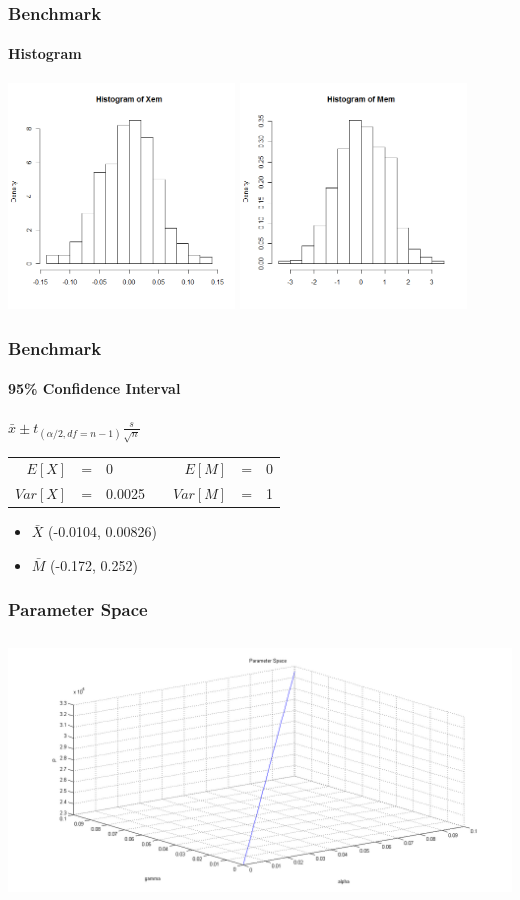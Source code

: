 \begin{frame}
    \frametitle{Benchmark}
	\framesubtitle{Histogram}
\hspace*{-5mm}
\includegraphics[height=6cm]{testhistX}
\includegraphics[height=6cm]{testhistM}
\end{frame}


\begin{frame}
    \frametitle{Benchmark}
	\framesubtitle{95\% Confidence Interval}
\begin{center}
	$\bar{x} \pm t_{(\alpha /2, df=n-1)} \frac{s}{\sqrt{n}}$ \\ 
\vspace{5mm}
\begin{tabular}{r c l c r c l}
	$E[X]$ &=& 0 && $E[M]$ &=& 0 \\
	$Var[X]$ &=& 0.0025  && $Var[M]$ &=& 1 
\end{tabular}
\end{center}
\begin{itemize}
	\item $\bar{X}$ (-0.0104, 0.00826)
	\item $\bar{M}$ (-0.172, 0.252)
\end{itemize}
\end{frame}


\begin{frame}
    \frametitle{Parameter Space}
\hspace*{-2cm}
\includegraphics[height=7cm]{parameterspace}
\end{frame}



